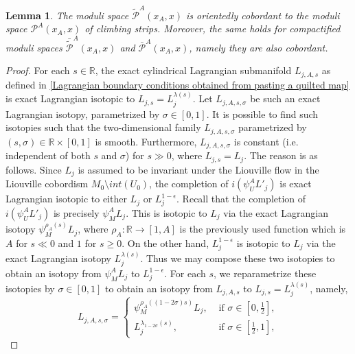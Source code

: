 \documentclass{amsart}
\newtheorem{lemma}[theorem]{Lemma}
\numberwithin{equation}{section}
\numberwithin{figure}{section}
\begin{document}
\begin{lemma}\label{cobordism of moduli spaces}
	The moduli space $\tilde{\mathcal{P}}^{A}(x_{A}, x)$ is orientedly cobordant to the moduli space $\mathcal{P}^{A}(x_{A}, x)$ of climbing strips. Moreover, the same holds for compactified moduli spaces $\bar{\tilde{\mathcal{P}}}^{A}(x_{A}, x)$ and $\bar{\mathcal{P}}^{A}(x_{A}, x)$, namely they are also cobordant.
\end{lemma}
\begin{proof}
	For each $s \in \mathbb{R}$, the exact cylindrical Lagrangian submanifold $L_{j, A, s}$ as defined in \eqref{Lagrangian boundary conditions obtained from pasting a quilted map} is exact Lagrangian isotopic to $L_{j, s} = L_{j}^{\lambda(s)}$.
Let $L_{j, A, s, \sigma}$ be such an exact Lagrangian isotopy, parametrized by $\sigma \in [0, 1]$. It is possible to find such isotopies such that the two-dimensional family $L_{j, A, s, \sigma}$ parametrized by $(s, \sigma) \in \mathbb{R} \times [0, 1]$ is smooth. Furthermore, $L_{j, A, s, \sigma}$ is constant (i.e. independent of both $s$ and $\sigma$) for $s \gg 0$, where $L_{j, s} = L_{j}$. The reason is as follows. Since $L_{j}$ is assumed to be invariant under the Liouville flow in the Liouville cobordism $M_{0} \setminus int(U_{0})$, the completion of $i(\psi_{U}^{A} L'_{j})$ is exact Lagrangian isotopic to either $L_{j}$ or $L_{j}^{1-\epsilon}$. Recall that the completion of $i(\psi_{U}^{A} L'_{j})$ is precisely $\psi_{M}^{A} L_{j}$. This is isotopic to $L_{j}$ via the exact Lagrangian isotopy $\psi_{M}^{\rho_{A}(s)} L_{j}$, where $\rho_{A}: \mathbb{R} \to [1, A]$ is the previously used function which is $A$ for $s \ll 0$ and $1$ for $s \ge 0$. On the other hand, $L_{j}^{1-\epsilon}$ is isotopic to $L_{j}$ via the exact Lagrangian isotopy $L_{j}^{\lambda(s)}$. Thus we may compose these two isotopies to obtain an isotopy from $\psi_{M}^{A} L_{j}$ to $L_{j}^{1-\epsilon}$. For each $s$, we reparametrize these isotopies by $\sigma \in [0, 1]$ to obtain an isotopy from $L_{j, A, s}$ to $L_{j, s} = L_{j}^{\lambda(s)}$, namely,
\begin{equation}\label{two-dimensional family of exact cylindrical Lagrangian submanifolds}
L_{j, A, s, \sigma} =
\begin{cases}
\psi_{M}^{\rho_{A}((1 - 2\sigma)s)} L_{j}, & \text{ if } \sigma \in [0, \frac{1}{2}],\\
L_{j}^{\lambda_{1 - 2\sigma}(s)}, & \text{ if } \sigma \in [\frac{1}{2}, 1],
\end{cases}
\end{equation}

\end{proof}
\end{document}
